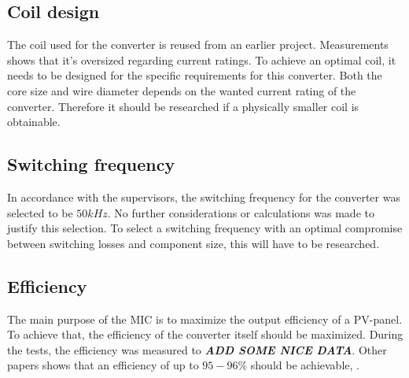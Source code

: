 \subsection{Coil design}
The coil used for the converter is reused from an earlier project. Measurements shows that it's oversized regarding current ratings. To achieve an optimal coil, it needs to be designed for the specific requirements for this converter. Both the core size and wire diameter depends on the wanted current rating of the converter\cite{underthehood}. Therefore it should be researched if a physically smaller coil is obtainable.

\subsection{Switching frequency}
In accordance with the supervisors, the switching frequency for the converter was selected to be $50kHz$. No further considerations or calculations was made to justify this selection. To select a switching frequency with an optimal compromise between switching losses and component size, this will have to be researched. 


\subsection{Efficiency}
The main purpose of the MIC is to maximize the output efficiency of a PV-panel. To achieve that, the efficiency of the converter itself should be maximized. During the tests, the efficiency was measured to \textbf{\textit{ADD SOME NICE DATA}}. Other papers shows that an efficiency of up to $95-96\%$ should be achievable\cite{underthehood}, \cite{efficient_buckboost}. 